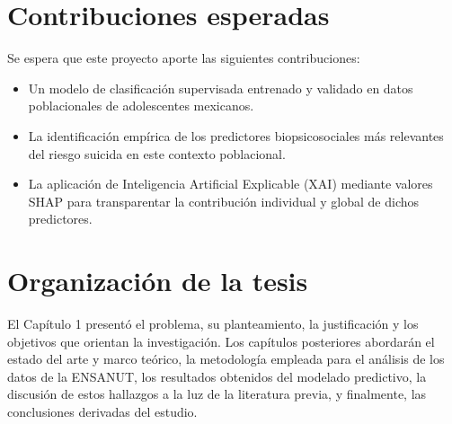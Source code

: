 \section{Contribuciones esperadas}

Se espera que este proyecto aporte las siguientes contribuciones:
\begin{itemize}
    \item Un modelo de clasificación supervisada entrenado y validado en datos poblacionales de adolescentes mexicanos.
    \item La identificación empírica de los predictores biopsicosociales más relevantes del riesgo suicida en este contexto poblacional.
    \item La aplicación de Inteligencia Artificial Explicable (XAI) mediante valores SHAP para transparentar la contribución individual y global de dichos predictores.
\end{itemize}

\section{Organización de la tesis}

El Capítulo 1 presentó el problema, su planteamiento, la justificación y los objetivos que orientan la investigación. Los capítulos posteriores abordarán el estado del arte y marco teórico, la metodología empleada para el análisis de los datos de la ENSANUT, los resultados obtenidos del modelado predictivo, la discusión de estos hallazgos a la luz de la literatura previa, y finalmente, las conclusiones derivadas del estudio.
